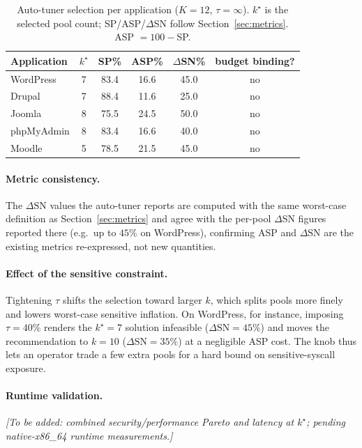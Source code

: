 \begin{table}[t]
\centering
\caption{Auto-tuner selection per application ($K=12$, $\tau=\infty$).
$k^\star$ is the selected pool count; SP/ASP/$\Delta$SN follow
Section~\ref{sec:metrics}. ASP $=100-$SP.}
\label{tab:autotune}
\begin{tabular}{lccccc}
\toprule
Application & $k^\star$ & SP\% & ASP\% & $\Delta$SN\% & budget binding? \\
\midrule
WordPress   & 7 & 83.4 & 16.6 & 45.0 & no \\
Drupal      & 7 & 88.4 & 11.6 & 25.0 & no \\
Joomla      & 8 & 75.5 & 24.5 & 50.0 & no \\
phpMyAdmin  & 8 & 83.4 & 16.6 & 40.0 & no \\
Moodle      & 5 & 78.5 & 21.5 & 45.0 & no \\
\bottomrule
\end{tabular}
\end{table}

\paragraph{Metric consistency.}
The $\Delta\mathrm{SN}$ values the auto-tuner reports are computed with the same
worst-case definition as Section~\ref{sec:metrics} and agree with the per-pool
$\Delta\mathrm{SN}$ figures reported there (e.g.\ up to $45\%$ on WordPress),
confirming ASP and $\Delta\mathrm{SN}$ are the existing metrics re-expressed, not
new quantities.

\paragraph{Effect of the sensitive constraint.}
Tightening $\tau$ shifts the selection toward larger $k$, which splits pools more
finely and lowers worst-case sensitive inflation. On WordPress, for instance,
imposing $\tau=40\%$ renders the $k^\star=7$ solution infeasible
($\Delta\mathrm{SN}=45\%$) and moves the recommendation to $k=10$
($\Delta\mathrm{SN}=35\%$) at a negligible ASP cost. The knob thus lets an
operator trade a few extra pools for a hard bound on sensitive-syscall exposure.

\paragraph{Runtime validation.}
\label{sec:eval-autotuner-runtime}
\emph{[To be added: combined security/performance Pareto and latency at
$k^\star$; pending native-x86\_64 runtime measurements.]}

